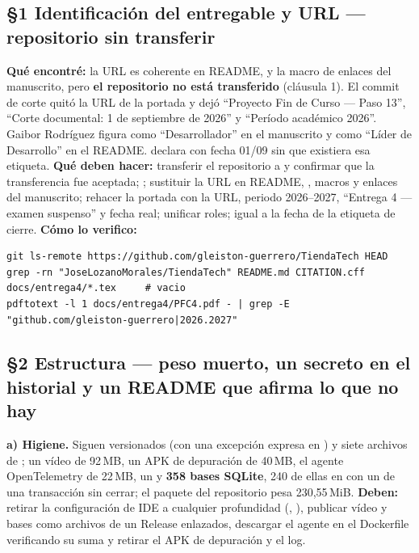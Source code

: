 \subsection*{\S1 Identificaci\'on del entregable y URL --- repositorio sin transferir}
\textbf{Qu\'e encontr\'e:} la URL  es coherente en README,  y la macro de enlaces del manuscrito, pero \textbf{el repositorio no est\'a transferido} (cl\'ausula 1). El commit de corte quit\'o la URL de la portada y dej\'o ``Proyecto Fin de Curso --- Paso 13'', ``Corte documental: 1 de septiembre de 2026'' y ``Per\'iodo acad\'emico 2026''. Gaibor Rodr\'iguez figura como ``Desarrollador'' en el manuscrito y como ``L\'ider de Desarrollo'' en el README.  declara  con fecha 01/09 sin que existiera esa etiqueta. \textbf{Qu\'e deben hacer:} transferir el repositorio a  y confirmar que la transferencia fue aceptada; ; sustituir la URL en README, , macros y enlaces del manuscrito; rehacer la portada con la URL, periodo 2026--2027, ``Entrega 4 --- examen suspenso'' y fecha real; unificar roles;  igual a la fecha de la etiqueta de cierre. \textbf{C\'omo lo verifico:}\begin{verbatim}
git ls-remote https://github.com/gleiston-guerrero/TiendaTech HEAD
grep -rn "JoseLozanoMorales/TiendaTech" README.md CITATION.cff docs/entrega4/*.tex     # vacio
pdftotext -l 1 docs/entrega4/PFC4.pdf - | grep -E "github.com/gleiston-guerrero|2026.2027"
\end{verbatim}

\subsection*{\S2 Estructura --- peso muerto, un secreto en el historial y un README que afirma lo que no hay}
\textbf{a) Higiene.} Siguen versionados  (con una excepci\'on expresa en ) y siete archivos de ; un v\'ideo de 92\,MB, un APK de depuraci\'on de 40\,MB, el agente OpenTelemetry de 22\,MB, un  y \textbf{358 bases SQLite}, 240 de ellas en  con un  de una transacci\'on sin cerrar; el paquete del repositorio pesa 230,55\,MiB. \textbf{Deben:} retirar la configuraci\'on de IDE a cualquier profundidad (, ), publicar v\'ideo y bases como archivos de un Release enlazados, descargar el agente en el Dockerfile verificando su suma y retirar el APK de depuraci\'on y el log.

